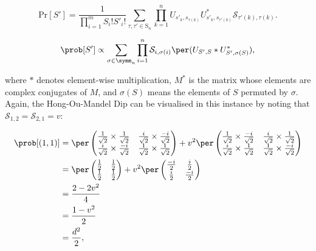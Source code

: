 \begin{equation}\label{eq:TichyDist}
\textrm{Pr}[S'] =  \frac{1}{\prod_{i=1}^m S_i! S'_i!} \sum_{\tau, \tau' \in \textrm{S}_n} \prod_{k=1}^n U_{s'_k,s_{\tau(k)}} U^\ast_{s'_k,s_{{\tau'}(k)}} \mathcal{S}_{{\tau'(k)},{\tau(k)}}.
\end{equation}

\noindent {}

\begin{equation}
\prob[S'] \propto \sum_{\sigma\in\symm_n}\prod_{i=1}^n\mathcal{S}_{i,\sigma(i)}\per(U_{S',S}*U_{S',\sigma(S)}^*),
\label{eqn:tichy-perm}
\end{equation}

\noindent where $*$ denotes element-wise multiplication, $M^*$ is the matrix whose elements are complex conjugates of $M$, and $\sigma(S)$ means the elements of $S$ permuted by $\sigma$. Again, the Hong-Ou-Mandel Dip can be visualised in this instance by noting that $\mathcal{S}_{1,2} = \mathcal{S}_{2,1} = v$:

\begin{align}
\prob[(1,1)] &= \per\begin{pmatrix}\frac{1}{\sqrt{2}}\times\frac{1}{\sqrt{2}}&\frac{i}{\sqrt{2}}\times\frac{-i}{\sqrt{2}}\\\frac{i}{\sqrt{2}}\times\frac{-i}{\sqrt{2}}&\frac{1}{\sqrt{2}}\times\frac{1}{\sqrt{2}}\end{pmatrix} + v^2 \per\begin{pmatrix}\frac{1}{\sqrt{2}}\times\frac{-i}{\sqrt{2}}&\frac{i}{\sqrt{2}}\times\frac{1}{\sqrt{2}}\\\frac{i}{\sqrt{2}}\times\frac{1}{\sqrt{2}}&\frac{1}{\sqrt{2}}\times\frac{-i}{\sqrt{2}}\end{pmatrix}\\
&= \per\begin{pmatrix}\frac{1}{2}&\frac{1}{2}\\\frac{1}{2}&\frac{1}{2}\end{pmatrix} + v^2 \per\begin{pmatrix}\frac{-i}{2}&\frac{i}{2}\\\frac{i}{2}&\frac{-i}{2}\end{pmatrix}\\
&= \frac{2-2v^2}{4}\\
&= \frac{1-v^2}{2}\\
&= \frac{d^2}{2},
\end{align}

